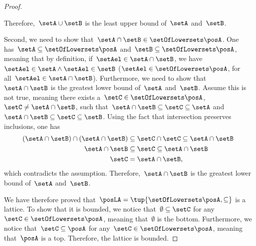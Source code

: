\begin{proof}
\begin{compactitem}
        Therefore,~$\setA\cup \setB$ is the least upper bound of~$\setA$ and~$\setB$.
        \item Second, we need to show that~$\setA\cap \setB\in \setOfLowersets \posA$.
        One has~$\setA\subseteq \setOfLowersets \posA$ and~$\setB\subseteq \setOfLowersets \posA$, meaning that by definition, if~$\setAel\in \setA\cap \setB$, we have~$\setAel \in \setA\wedge \setAel\in \setB$ ($\setAel\in \setOfLowersets \posA$, for all~$\setAel\in \setA\cap \setB$).
        Furthermore, we need to show that~$\setA\cap \setB$ is the greatest lower bound of~$\setA$ and~$\setB$.
        Assume this is not true, meaning there exists a~$\setC\in \setOfLowersets \posA$,~$\setC\neq \setA\cap \setB$, such that~$\setA\cap \setB\subseteq \setC\subseteq \setA$ and~$\setA\cap \setB\subseteq \setC\subseteq \setB$.
        Using the fact that intersection preserves inclusions, one has
        \begin{equation}
            \begin{aligned}
            (\setA\cap \setB)
                \cap (\setA\cap \setB) &\subseteq \setC \cap \setC \subseteq \setA\cap \setB\\
                \setA\cap \setB &\subseteq \setC\subseteq \setA\cap \setB\\
                \setC&=\setA\cap \setB,
            \end{aligned}
        \end{equation}
        which contradicts the assumption.
        Therefore,~$\setA\cap \setB$ is the greatest lower bound of~$\setA$ and~$\setB$.
    \end{compactitem}
    We have therefore proved that~$\posLA=\tup{\setOfLowersets \posA,\subseteq}$ is a lattice.
    To show that it is bounded, we notice that~$\emptyset \subseteq \setC$ for any~$\setC\in \setOfLowersets \posA$, meaning that~$\emptyset$ is the bottom.
    Furthermore, we notice that~$\setC\subseteq \posA$ for any~$\setC\in \setOfLowersets \posA$, meaning that~$\posA$ is a top.
    Therefore, the lattice is bounded.
\end{proof}
